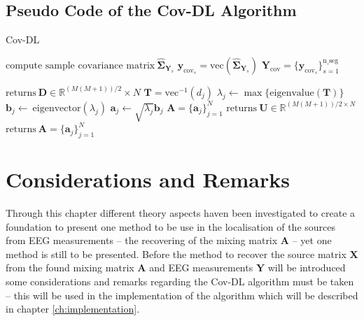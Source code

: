 \subsection{Pseudo Code of the Cov-DL Algorithm}
\begin{algorithm}[H]
\caption{Cov-DL}
\begin{algorithmic}[1]
				\State$\text{compute sample covariance matrix}\ \widehat{\boldsymbol{\Sigma}}_{\textbf{Y}_s} $
				\State$\textbf{y}_{\text{cov}_s} = \text{vec}(\widehat{\boldsymbol{\Sigma}}_{\textbf{Y}_s})$	
			\EndFor			
			\State$\textbf{Y}_{\text{cov}} = \{\textbf{y}_{\text{cov}_s}\}_{s=1}^{\text{n\_seg}}$
			
			\State$\text{returns} \ \textbf{D} \in \mathbb{R}^{(M(M+1))/2}\times N$
			\EndProcedure
			\State$\textbf{T} = \text{vec}^{-1}(d_j)$            
			\State$\lambda_j\gets \max\{\text{eigenvalue}(\textbf{T})\}$
			\State$\textbf{b}_j \gets \ \text{eigenvector}(\lambda_j)$
			\State$\textbf{a}_j \gets \sqrt{\lambda_j}\textbf{b}_j$
			\EndFor
			\State$\textbf{A} = \{\textbf{a}_j\}_{j=1}^N$
			\EndIf
			\State
				\State$\text{returns} \ \textbf{U}\in \mathbb{R}^{(M(M+1))/2\times N}$
				\EndProcedure
				\State$\text{returns}\ \textbf{A}= \{\textbf{a}_j\}_{j=1}^{N}$
				\EndProcedure
			\EndIf
           \EndProcedure
        \end{algorithmic} 
        \label{alg:Cov1}
\end{algorithm}

\section{Considerations and Remarks}
Through this chapter different theory aspects haven been investigated to create a foundation to present one method to be use in the localisation of the sources from EEG measurements -- the recovering of the mixing matrix $\mathbf{A}$ -- yet one method is still to be presented.
Before the method to recover the source matrix $\mathbf{X}$ from the found mixing matrix $\mathbf{A}$ and EEG measurements $\mathbf{Y}$ will be introduced some considerations and remarks regarding the Cov-DL algorithm must be taken -- this will be used in the implementation of the algorithm which will be described in chapter \ref{ch:implementation}.

